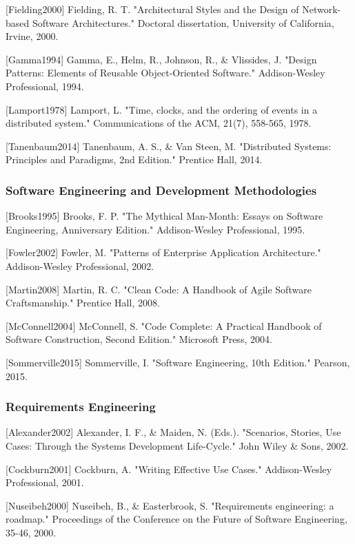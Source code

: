 \documentclass[11pt,a4paper]{report}
\begin{document}
{{[Fielding2000] Fielding, R. T. "Architectural Styles and the Design of Network-based Software Architectures." Doctoral
dissertation, University of California, Irvine, 2000.

[Gamma1994] Gamma, E., Helm, R., Johnson, R., \& Vlissides, J. "Design Patterns: Elements of Reusable Object-Oriented
Software." Addison-Wesley Professional, 1994.

[Lamport1978] Lamport, L. "Time, clocks, and the ordering of events in a distributed system." Communications of the ACM,
21(7), 558-565, 1978.

[Tanenbaum2014] Tanenbaum, A. S., \& Van Steen, M. "Distributed Systems: Principles and Paradigms, 2nd Edition." Prentice
Hall, 2014.

\subsubsection{Software Engineering and Development Methodologies}

[Brooks1995] Brooks, F. P. "The Mythical Man-Month: Essays on Software Engineering, Anniversary Edition." Addison-Wesley
Professional, 1995.

[Fowler2002] Fowler, M. "Patterns of Enterprise Application Architecture." Addison-Wesley Professional, 2002.

[Martin2008] Martin, R. C. "Clean Code: A Handbook of Agile Software Craftsmanship." Prentice Hall, 2008.

[McConnell2004] McConnell, S. "Code Complete: A Practical Handbook of Software Construction, Second Edition." Microsoft
Press, 2004.

[Sommerville2015] Sommerville, I. "Software Engineering, 10th Edition." Pearson, 2015.

\subsubsection{Requirements Engineering}

[Alexander2002] Alexander, I. F., \& Maiden, N. (Eds.). "Scenarios, Stories, Use Cases: Through the Systems Development
Life-Cycle." John Wiley \& Sons, 2002.

[Cockburn2001] Cockburn, A. "Writing Effective Use Cases." Addison-Wesley Professional, 2001.

[Nuseibeh2000] Nuseibeh, B., \& Easterbrook, S. "Requirements engineering: a roadmap." Proceedings of the Conference on
the Future of Software Engineering, 35-46, 2000.

}}
\end{document}
